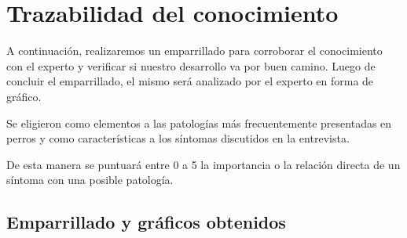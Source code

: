 \documentclass[a4paper,table,xcdraw]{article}
\begin{document}
\section{Trazabilidad del conocimiento}
A continuación, realizaremos un emparrillado para corroborar el conocimiento con el experto y verificar si nuestro desarrollo va por buen camino.
Luego de concluir el emparrillado, el mismo será analizado por el experto en forma de gráfico.

Se eligieron como elementos a las patologías más frecuentemente presentadas en perros y como características a los síntomas discutidos en la entrevista.

De esta manera se puntuará entre 0 a 5 la importancia o la relación directa de un síntoma con una posible patología.

\subsection{Emparrillado y gráficos obtenidos}
\end{document}
